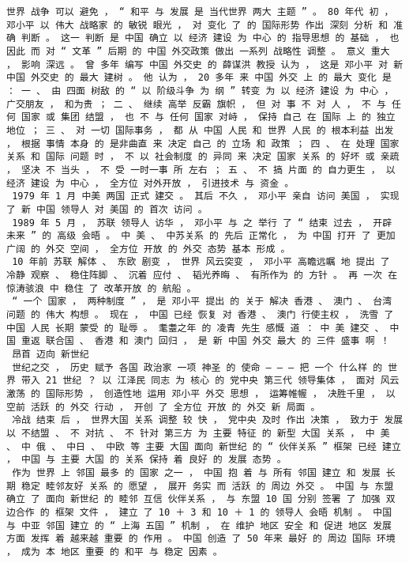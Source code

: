 \documentclass{article}
\begin{document}
\begin{Verbatim}[commandchars=\\\{\}]
 世界 战争 可以 避免 ， “ 和平 与 发展 是 当代世界 两大 主题 ” 。 80 年代 初 ， 邓小平 以 伟大 战略家 的 敏锐 眼光 ， 对 变化 了 的 国际形势 作出 深刻 分析 和 准确 判断 。 这一 判断 是 中国 确立 以 经济 建设 为 中心 的 指导思想 的 基础 ， 也 因此 而 对 “ 文革 ” 后期 的 中国 外交政策 做出 一系列 战略性 调整 。 意义 重大 ， 影响 深远 。 曾 多年 编写 中国 外交史 的 薛谋洪 教授 认为 ， 这是 邓小平 对 新 中国 外交史 的 最大 建树 。 他 认为 ， 20 多年 来 中国 外交 上 的 最大 变化 是 ： 一 、 由 四面 树敌 的 “ 以 阶级斗争 为 纲 ” 转变 为 以 经济 建设 为 中心 ， 广交朋友 ， 和为贵 ； 二 、 继续 高举 反霸 旗帜 ， 但 对 事 不 对 人 ， 不 与 任何 国家 或 集团 结盟 ， 也 不 与 任何 国家 对峙 ， 保持 自己 在 国际 上 的 独立 地位 ； 三 、 对 一切 国际事务 ， 都 从 中国 人民 和 世界 人民 的 根本利益 出发 ， 根据 事情 本身 的 是非曲直 来 决定 自己 的 立场 和 政策 ； 四 、 在 处理 国家 关系 和 国际 问题 时 ， 不 以 社会制度 的 异同 来 决定 国家 关系 的 好坏 或 亲疏 ， 坚决 不 当头 ， 不 受 一时一事 所 左右 ； 五 、 不 搞 片面 的 自力更生 ， 以 经济 建设 为 中心 ， 全方位 对外开放 ， 引进技术 与 资金 。 
 1979 年 1 月 中美 两国 正式 建交 。 其后 不久 ， 邓小平 亲自 访问 美国 ， 实现 了 新 中国 领导人 对 美国 的 首次 访问 。 
 1989 年 5 月 ， 苏联 领导人 访华 ， 邓小平 与 之 举行 了 “ 结束 过去 ， 开辟 未来 ” 的 高级 会晤 。 中 美 、 中苏关系 的 先后 正常化 ， 为 中国 打开 了 更加 广阔 的 外交 空间 ， 全方位 开放 的 外交 态势 基本 形成 。 
 10 年前 苏联 解体 、 东欧 剧变 ， 世界 风云突变 ， 邓小平 高瞻远瞩 地 提出 了 冷静 观察 、 稳住阵脚 、 沉着 应付 、 韬光养晦 、 有所作为 的 方针 。 再 一次 在 惊涛骇浪 中 稳住 了 改革开放 的 航船 。 
 “ 一个 国家 ， 两种制度 ” ， 是 邓小平 提出 的 关于 解决 香港 、 澳门 、 台湾 问题 的 伟大 构想 。 现在 ， 中国 已经 恢复 对 香港 、 澳门 行使主权 ， 洗雪 了 中国 人民 长期 蒙受 的 耻辱 。 耄耋之年 的 凌青 先生 感慨 道 ： 中 美 建交 、 中国 重返 联合国 、 香港 和 澳门 回归 ， 是 新 中国 外交 最大 的 三件 盛事 啊 ！ 
 昂首 迈向 新世纪 
 世纪之交 ， 历史 赋予 各国 政治家 一项 神圣 的 使命 — — — 把 一个 什么样 的 世界 带入 21 世纪 ？ 以 江泽民 同志 为 核心 的 党中央 第三代 领导集体 ， 面对 风云 激荡 的 国际形势 ， 创造性地 运用 邓小平 外交 思想 ， 运筹帷幄 ， 决胜千里 ， 以 空前 活跃 的 外交 行动 ， 开创 了 全方位 开放 的 外交 新 局面 。 
 冷战 结束 后 ， 世界大国 关系 调整 较 快 ， 党中央 及时 作出 决策 ， 致力于 发展 以 不结盟 、 不 对抗 、 不 针对 第三方 为 主要 特征 的 新型 大国 关系 ， 中 美 、 中 俄 、 中日 、 中欧 等 主要 大国 面向 新世纪 的 “ 伙伴关系 ” 框架 已经 建立 ， 中国 与 主要 大国 的 关系 保持 着 良好 的 发展 态势 。 
 作为 世界 上 邻国 最多 的 国家 之一 ， 中国 抱 着 与 所有 邻国 建立 和 发展 长期 稳定 睦邻友好 关系 的 愿望 ， 展开 务实 而 活跃 的 周边 外交 。 中国 与 东盟 确立 了 面向 新世纪 的 睦邻 互信 伙伴关系 ， 与 东盟 10 国 分别 签署 了 加强 双边合作 的 框架 文件 ， 建立 了 10 ＋ 3 和 10 ＋ 1 的 领导人 会晤 机制 。 中国 与 中亚 邻国 建立 的 “ 上海 五国 ” 机制 ， 在 维护 地区 安全 和 促进 地区 发展 方面 发挥 着 越来越 重要 的 作用 。 中国 创造 了 50 年来 最好 的 周边 国际 环境 ， 成为 本 地区 重要 的 和平 与 稳定 因素 。 

\end{Verbatim}
\end{document}
